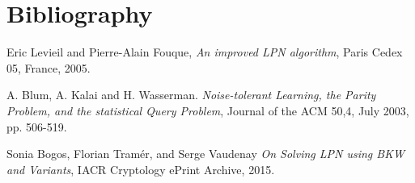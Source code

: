 \section{Bibliography}

\begin{thebibliography}{9}

  Eric Levieil and Pierre-Alain Fouque,
  \emph{An improved LPN algorithm},
  Paris Cedex 05, France, 2005.
  
  A. Blum, A. Kalai and H. Wasserman.
  \emph{Noise-tolerant Learning, the Parity Problem, and the statistical Query Problem},
  Journal of the ACM 50,4, July 2003, pp. 506-519.
  
  Sonia Bogos, Florian Tramér, and Serge Vaudenay
  \emph{On Solving LPN using BKW and Variants},
  {IACR} Cryptology ePrint Archive, 2015.  
  

\end{thebibliography}